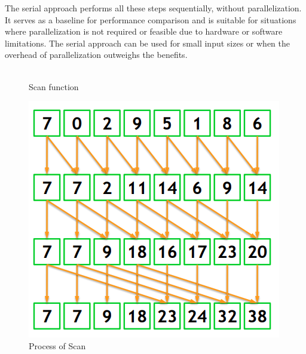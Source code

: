 The serial approach performs all these steps sequentially, without parallelization. It serves as a baseline for performance comparison and is suitable for situations where parallelization is not required or feasible due to hardware or software limitations. The serial approach can be used for small input sizes or when the overhead of parallelization outweighs the benefits.
\\ \\

\begin{figure}[htb]
    \begin{minipage}{0.5\textwidth}
        \begin{algorithm}[H]
            
            \caption{Scan function}
        \end{algorithm}
    \end{minipage}%
    \begin{minipage}{0.5\textwidth}
        \centering
        \includegraphics[width=0.7\linewidth]{pics/scanExample.png}
        \caption{Process of Scan}
        \label{fig:scanExample}
    \end{minipage}
\end{figure}

